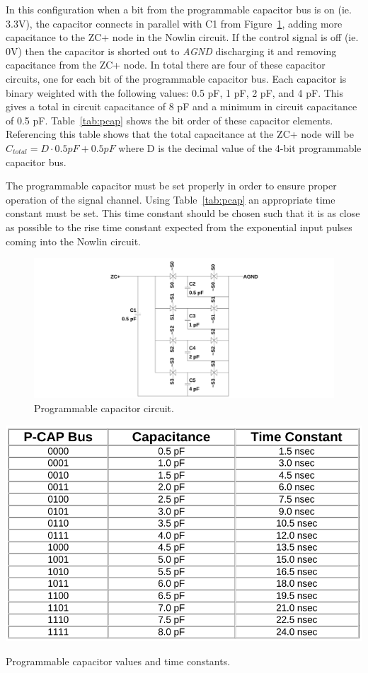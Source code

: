 \documentclass[12pt,oneside,final]{siuethesis}
\theoremstyle{definition}
\begin{document}
\par In this configuration when a bit from the programmable capacitor bus is on (ie. 3.3V), the capacitor connects in parallel with C1 from Figure~\ref{fig:pcap}, adding more capacitance to the ZC+ node in the Nowlin circuit. If the control signal is off (ie. 0V) then the capacitor is shorted out to \emph{AGND} discharging it and removing capacitance from the ZC+ node. In total there are four of these capacitor circuits, one for each bit of the programmable capacitor bus. Each capacitor is binary weighted with the following values: 0.5 pF, 1 pF, 2 pF, and 4 pF. This gives a total in circuit capacitance of 8 pF and a minimum in circuit capacitance of 0.5 pF. Table~\ref{tab:pcap} shows the bit order of these capacitor elements. Referencing this table shows that the total capacitance at the ZC+ node will be $C_{total} = D \cdot 0.5 pF + 0.5 pF$ where D is the decimal value of the 4-bit programmable capacitor bus.
\par The programmable capacitor must be set properly in order to ensure proper operation of the signal channel. Using Table~\ref{tab:pcap} an appropriate time constant must be set. This time constant should be chosen such that it is as close as possible to the rise time constant expected from the exponential input pulses coming into the Nowlin circuit.
\begin{figure}[ht]
\centering
\includegraphics[scale=.30,keepaspectratio=true]{../LTspice_Drawings/nowlin/pcap.png} 
\caption{Programmable capacitor circuit.}
\label{fig:pcap}
\end{figure}

\begin{table}[ht]
 \centering
 \includegraphics[scale=.4,keepaspectratio=true]{../data/pcap.png}
 \caption{Programmable capacitor values and time constants.}
 \label{tab:pcap}
\end{table}
\end{document}
